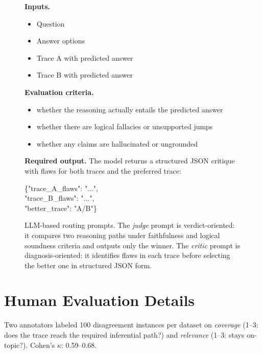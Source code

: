 \documentclass[11pt]{article}
\begin{document}
\begin{figure}[t]
\begin{minipage}[t]{0.485\textwidth}
\begin{tcolorbox}[promptcard,title=LLM-as-Critic]
\vspace{2pt}
\textbf{Inputs.}
\begin{itemize}
    \setlength{\itemsep}{1pt}
    \item Question
    \item Answer options
    \item Trace A with predicted answer
    \item Trace B with predicted answer
\end{itemize}

\vspace{-2pt}
\textbf{Evaluation criteria.}
\begin{itemize}
    \setlength{\itemsep}{1pt}
    \item whether the reasoning actually entails the predicted answer
    \item whether there are logical fallacies or unsupported jumps
    \item whether any claims are hallucinated or ungrounded
\end{itemize}

\vspace{-2pt}
\textbf{Required output.}
The model returns a structured JSON critique with flaws for both traces and the preferred trace:
\begin{center}
\ttfamily
\{"trace\_A\_flaws": "...",\\
"trace\_B\_flaws": "...",\\
"better\_trace": "A/B"\}
\end{center}
\end{tcolorbox}
\end{minipage}

\vspace{2pt}
\caption{LLM-based routing prompts. The \emph{judge} prompt is verdict-oriented: it compares two reasoning paths under faithfulness and logical soundness criteria and outputs only the winner. The \emph{critic} prompt is diagnosis-oriented: it identifies flaws in each trace before selecting the better one in structured JSON form.}
\label{fig:judge_critic_prompts}
\end{figure}


\section{Human Evaluation Details}
\label{app:human_eval}

Two annotators labeled 100 disagreement instances per dataset on \emph{coverage} (1--3: does the trace reach the required inferential path?) and \emph{relevance} (1--3: stays on-topic?). Cohen's $\kappa$: 0.59--0.68.
\end{document}
